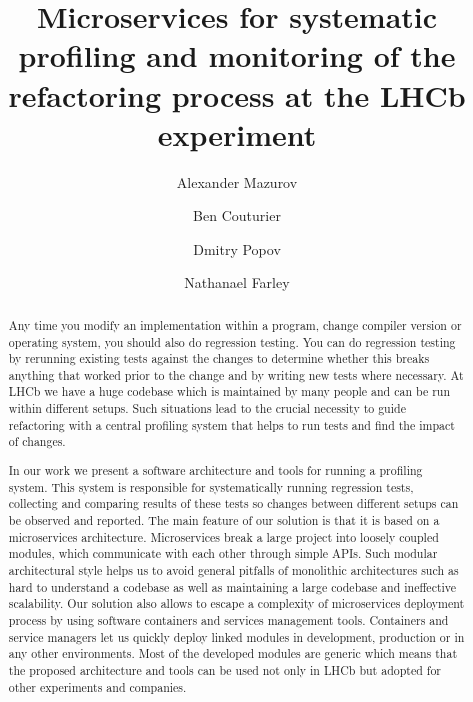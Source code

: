 \documentclass[10pt]{iopart}
\begin{document}
\title[Microservices for systematic profiling and monitoring of the refactoring process]{Microservices for systematic profiling and monitoring of the refactoring process at the LHCb experiment}

\author{Alexander Mazurov}
\address{University of Birmingham, United Kingdom}

\author{Ben Couturier}
\address{CERN, Switzerland}

\author{Dmitry Popov}
\address{CERN, Switzerland} 
\address{Max-Planck-Institut für Kernphysik, Germany}

\author{Nathanael Farley }
\address{University of Birmingham, United Kingdom}

\newcommand\docker{\textit{Docker} }
\newcommand\compose{\textit{Compose} }
\newcommand\composes{\textit{Compose's} }

\begin{abstract}
Any time you modify an implementation within a program, change compiler version
or operating system, you should also do regression testing. You can do
regression testing by rerunning existing tests against the changes to determine
whether this breaks anything that worked prior to the change and by writing new
tests where necessary. At LHCb we have a huge codebase which is maintained by
many people and can be run within different setups. Such situations lead to the
crucial necessity to guide refactoring with a central profiling system that
helps to run tests and find the impact of changes.

In our work we present a software architecture and tools for running a profiling
system. This system is responsible for systematically running regression tests,
collecting and comparing results of these tests so changes between different
setups can be observed and reported. The main feature of our solution is that it
is based on a microservices architecture. Microservices break a large project
into loosely coupled modules, which communicate with each other through simple
APIs. Such modular architectural style helps us to avoid general pitfalls of
monolithic architectures such as hard to understand a codebase as well as
maintaining a large codebase and ineffective scalability. Our solution also
allows to escape a complexity of microservices deployment process by using
software containers and services management tools. Containers and service
managers let us quickly deploy linked modules in development, production or in
any other environments. Most of the developed modules are generic which means
that the proposed architecture and tools can be used not only in LHCb but
adopted for other experiments and companies. \end{abstract}
\end{document}
